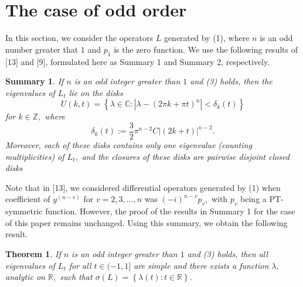 \documentclass{article}%
\newtheorem{theorem}{Theorem}
{}
\newtheorem{summary}{Summary}
\begin{document}
\section{The case of odd order}

In this section, we consider the operators $L$ generated by (1), where $n$ is
an odd number greater that $1$ and $p_{1}$ is the zero function. We use the
following results of [13] and [9], formulated here as Summary 1 and Summary 2, respectively.

\begin{summary}
If $n$ is an odd integer greater than $1$ and (3) holds, then the eigenvalues
of $L_{t}$ lie on the disks
\[
U(k,t)=\left\{  \lambda\in\mathbb{C}:\left\vert \lambda-(2\pi k+\pi
t)^{n}\right\vert <\delta_{k}(t)\right\}
\]
for $k\in\mathbb{Z},$ where
\[
\delta_{k}(t):=\frac{3}{2}\pi^{n-2}C\left\vert (2k+t)\right\vert ^{n-2}.
\]
Moreover, each of these disks contains only one eigenvalue (counting
multiplicities) of $L_{t},$ and the closures of these disks are pairwise
disjoint closed disks
\end{summary}

Note that in [13], we considered differential operators generated by (1) when
coefficient of $y^{(n-v)}$ for $v=2,3,...,n$ was $(-i)^{n-v}p_{v},$ with
$p_{v}$ being a PT-symmetric function. However, the proof of the results in
Summary 1 for the case of this paper remains unchanged. Using this summary, we
obtain the following result.

\begin{theorem}
If $n$ is an odd integer greater than $1$ and (3) holds, then all eigenvalues
of $L_{t}$ for all $t\in(-1,1]$ are simple and there exists a function
$\lambda,$ analytic on $\mathbb{R},$ such that $\sigma(L)=\left\{
\lambda(t):t\in\mathbb{R}\right\}  .$
\end{theorem}
\end{document}
